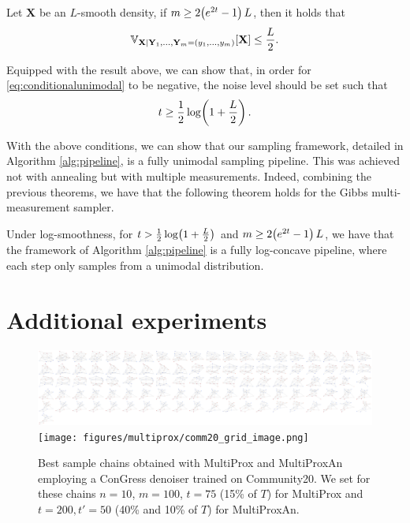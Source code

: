 \begin{theorem}
\label{thm:variance}
    Let $\mathbf{X}$ be an $L$-smooth density, if $m \geq 2\mathopen{}\left(e^{2t} - 1\right)L$, then it holds that
    \begin{equation}
       \mathbb{V}_{\mathbf{X}|\mathbf{Y}_1, \dots, \mathbf{Y}_m =(y_1, \dots, y_m)}\mathopen{}\left[\mathbf{X}\right] \leq \frac{L}{2}.
    \end{equation}
\end{theorem}

Equipped with the result above, we can show that, in order for \eqref{eq:conditionalunimodal} to be negative, the noise level should be set such that
\begin{equation}
t \geq \frac{1}{2}\log\mathopen{}\left(1 + \frac{L}{2}\right).
\end{equation}

With the above conditions, we can show that our sampling framework, detailed in Algorithm \ref{alg:pipeline}, is a fully unimodal sampling pipeline. This was achieved not with annealing but with multiple measurements. Indeed, combining the previous theorems, we have that the following theorem holds for the Gibbs multi-measurement sampler.

\begin{theorem}
    \label{thm:logconcavepipe}
    Under log-smoothness, for $t> \frac{1}{2}\log\mathopen{}\left(1 + \frac{L}{2}\right)$ and $m \geq 2\mathopen{}\left(e^{2t} - 1\right)L$, we have that the framework of Algorithm \ref{alg:pipeline} is a fully log-concave pipeline, where each step only samples from a unimodal distribution.
\end{theorem}

\section{Additional experiments}
\label{sec:appendix_multiprox_experiments}

\begin{figure}[H]
    \centering
    \includegraphics[width=\linewidth]{figures/multiprox/comm20_grid_image_single_noise.png}
    \texttt{[image: figures/multiprox/comm20\_grid\_image.png]}
    \caption[Best sample chains obtained with MultiProx and MultiProxAn on Community20.]{Best sample chains obtained with MultiProx and MultiProxAn employing a ConGress denoiser trained on Community20. We set for these chains $n=10$, $m=100$, $t=75$ (15\% of $T$) for MultiProx and $t=200, t'=50$ (40\% and 10\% of $T$) for MultiProxAn.}
    \label{fig:comm20_extra}
\end{figure}

